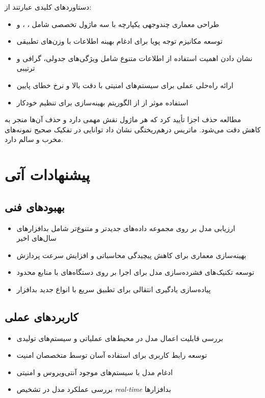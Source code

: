 \documentclass[a4paper,oneside,12pt]{report}
\theoremstyle{definition}
\begin{document}
دستاوردهای کلیدی عبارتند از:
\begin{itemize}
    \item طراحی معماری چندوجهی یکپارچه با سه ماژول تخصصی شامل ، ، و 
    \item توسعه مکانیزم توجه پویا برای ادغام بهینه اطلاعات با وزن‌های تطبیقی
    \item نشان دادن اهمیت استفاده از اطلاعات متنوع شامل ویژگی‌های جدولی، گرافی و ترتیبی
    \item ارائه راه‌حلی عملی برای سیستم‌های امنیتی با دقت بالا و نرخ خطای پایین
    \item استفاده موثر از از الگوریتم بهینه‌سازی  برای تنظیم خودکار
\end{itemize}

مطالعه حذف اجزا تأیید کرد که هر ماژول نقش مهمی دارد و حذف آن‌ها منجر به کاهش دقت می‌شود. ماتریس درهم‌ریختگی نشان داد توانایی در تفکیک صحیح نمونه‌های مخرب و سالم دارد.

\section{پیشنهادات آتی}
\subsection{بهبودهای فنی}
\begin{itemize}
    \item ارزیابی مدل بر روی مجموعه داده‌های جدیدتر و متنوع‌تر شامل بدافزارهای سال‌های اخیر
    \item بهینه‌سازی معماری برای کاهش پیچیدگی محاسباتی و افزایش سرعت پردازش
    \item توسعه تکنیک‌های فشرده‌سازی مدل برای اجرا بر روی دستگاه‌های با منابع محدود
    \item پیاده‌سازی یادگیری انتقالی برای تطبیق سریع با انواع جدید بدافزار
\end{itemize}

\subsection{کاربردهای عملی}
\begin{itemize}
    \item بررسی قابلیت اعمال مدل در محیط‌های عملیاتی و سیستم‌های تولیدی
    \item توسعه رابط کاربری برای استفاده آسان توسط متخصصان امنیت
    \item ادغام مدل با سیستم‌های موجود آنتی‌ویروس و امنیتی
    \item بررسی عملکرد مدل در تشخیص \textit{real-time} بدافزارها
\end{itemize}
\end{document}
